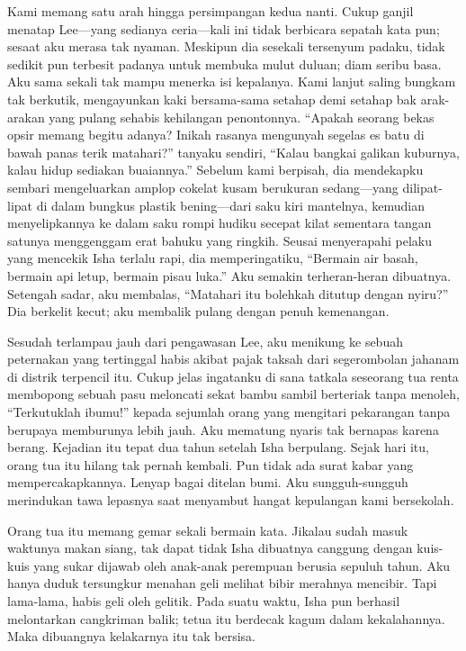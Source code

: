 \documentclass[smalldemyvopaper,11pt,twoside,onecolumn,openright,extrafontsizes]{memoir}
\begin{document}

Kami memang satu arah hingga persimpangan kedua nanti. Cukup ganjil menatap Lee---yang sedianya ceria---kali ini tidak berbicara sepatah kata pun; sesaat aku merasa tak nyaman. Meskipun dia sesekali tersenyum padaku, tidak sedikit pun terbesit padanya untuk membuka mulut duluan; diam seribu basa. Aku sama sekali tak mampu menerka isi kepalanya. Kami lanjut saling bungkam tak berkutik, mengayunkan kaki bersama-sama setahap demi setahap bak arak-arakan yang pulang sehabis kehilangan penontonnya. ``Apakah seorang bekas opsir memang begitu adanya? Inikah rasanya mengunyah segelas es batu di bawah panas terik matahari?'' tanyaku sendiri, ``Kalau bangkai galikan kuburnya, kalau hidup sediakan buaiannya.'' Sebelum kami berpisah, dia mendekapku sembari mengeluarkan amplop cokelat kusam berukuran sedang---yang dilipat-lipat di dalam bungkus plastik bening---dari saku kiri mantelnya, kemudian menyelipkannya ke dalam saku rompi hudiku secepat kilat sementara tangan satunya menggenggam erat bahuku yang ringkih. Seusai menyerapahi pelaku yang mencekik Isha terlalu rapi, dia memperingatiku, ``Bermain air basah, bermain api letup, bermain pisau luka.'' Aku semakin terheran-heran dibuatnya. Setengah sadar, aku membalas, ``Matahari itu bolehkah ditutup dengan nyiru?'' Dia berkelit kecut; aku membalik pulang dengan penuh kemenangan.


Sesudah terlampau jauh dari pengawasan Lee, aku menikung ke sebuah peternakan yang tertinggal habis akibat pajak taksah dari segerombolan jahanam di distrik terpencil itu. Cukup jelas ingatanku di sana tatkala seseorang tua renta membopong sebuah pasu meloncati sekat bambu sambil berteriak tanpa menoleh, ``Terkutuklah ibumu!'' kepada sejumlah orang yang mengitari pekarangan tanpa berupaya memburunya lebih jauh. Aku mematung nyaris tak bernapas karena berang. Kejadian itu tepat dua tahun setelah Isha berpulang. Sejak hari itu, orang tua itu hilang tak pernah kembali. Pun tidak ada surat kabar yang  mempercakapkannya. Lenyap bagai ditelan bumi. Aku sungguh-sungguh merindukan tawa lepasnya saat menyambut hangat kepulangan kami bersekolah.

Orang tua itu memang gemar sekali bermain kata. Jikalau sudah masuk waktunya makan siang, tak dapat tidak Isha dibuatnya canggung dengan kuis-kuis yang sukar dijawab oleh anak-anak perempuan berusia sepuluh tahun. Aku hanya duduk tersungkur menahan geli melihat bibir merahnya mencibir. Tapi lama-lama, habis geli oleh gelitik. Pada suatu waktu, Isha pun berhasil melontarkan cangkriman balik; tetua itu berdecak kagum dalam kekalahannya. Maka dibuangnya kelakarnya itu tak bersisa.
\end{document}
